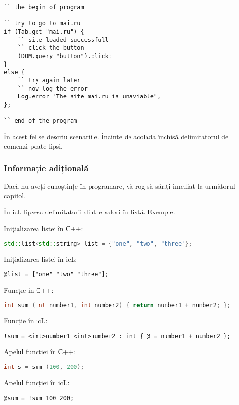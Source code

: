 \begin{lstlisting}[caption=Cod cu spații,label=readable]
`` the begin of program

`` try to go to mai.ru
if (Tab.get "mai.ru") {
	`` site loaded successfull
	`` click the button
	(DOM.query "button").click;
}
else {
	`` try again later
	`` now log the error
	Log.error "The site mai.ru is unaviable";
};

`` end of the program
\end{lstlisting}

În acest fel se descriu scenariile. Înainte de acolada închisă delimitatorul de comenzi poate lipsi.

\subsubsection{Informație adițională}

Dacă nu aveți cunoștințe în programare, vă rog să săriți imediat la următorul capitol.

În icL lipsesc delimitatorii dintre valori în listă. Exemple:

\begin{icItems}
	\item Inițializarea listei în С++:
\begin{lstlisting}[numbers=none, language=C++]
std::list<std::string> list = {"one", "two", "three"};
\end{lstlisting}
	Inițializarea listei în icL:
\begin{lstlisting}[numbers=none]
@list = ["one" "two" "three"];
\end{lstlisting}
	\item Funcție în С++:
\begin{lstlisting}[numbers=none, language=C++]
int sum (int number1, int number2) { return number1 + number2; };
\end{lstlisting}
	Funcție în icL:
\begin{lstlisting}[numbers=none]
!sum = <int>number1 <int>number2 : int { @ = number1 + number2 };
\end{lstlisting}
	\item Apelul funcției în С++:
\begin{lstlisting}[numbers=none, language=C++]
int s = sum (100, 200);
\end{lstlisting}
	Apelul funcției în icL:
\begin{lstlisting}[numbers=none]
@sum = !sum 100 200;
\end{lstlisting}
\end{icItems}
